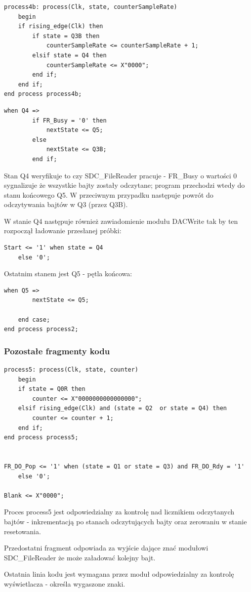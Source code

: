 \documentclass{article}
\begin{document}
\begin{lstlisting}[basicstyle=\small]
 process4b: process(Clk, state, counterSampleRate)
	begin 
	if rising_edge(Clk) then
		if state = Q3B then
			counterSampleRate <= counterSampleRate + 1;
		elsif state = Q4 then
			counterSampleRate <= X"0000";
		end if;
	end if;
end process process4b;
\end{lstlisting}
\newpage
\begin{lstlisting}[basicstyle=\small]
	when Q4 =>
		if FR_Busy = '0' then
			nextState <= Q5;
		else
			nextState <= Q3B;
		end if;
\end{lstlisting}
\par Stan Q4 weryfikuje to czy SDC\_FileReader pracuje - FR\_Busy o wartości 0 sygnalizuje że wszystkie bajty zostały odczytane; program przechodzi wtedy do stanu końcowego Q5. W przeciwnym przypadku następuje powrót do odczytywania bajtów w Q3 (przez Q3B).
\par W stanie Q4 następuje również zawiadomienie modułu DACWrite tak by ten rozpoczął ładowanie przesłanej próbki:
\begin{lstlisting}[basicstyle=\small]
Start <= '1' when state = Q4
	else '0';
\end{lstlisting}
\par Ostatnim stanem jest Q5 - pętla końcowa:
\begin{lstlisting}[basicstyle=\small]
	when Q5 =>
		nextState <= Q5;
	
	end case;
end process process2;
\end{lstlisting}

\subsubsection{Pozostałe fragmenty kodu}

\begin{lstlisting}[basicstyle=\small]
process5: process(Clk, state, counter)
	begin
	if state = Q0R then
		counter <= X"0000000000000000";
	elsif rising_edge(Clk) and (state = Q2  or state = Q4) then
		counter <= counter + 1;
	end if;
end process process5;


FR_DO_Pop <= '1' when (state = Q1 or state = Q3) and FR_DO_Rdy = '1'
	else '0';
	
Blank <= X"0000";
\end{lstlisting}
\par Proces process5 jest odpowiedzialny za kontrolę nad licznikiem odczytanych bajtów - inkrementacją po stanach odczytujących bajty oraz zerowaniu w stanie resetowania.
\par Przedostatni fragment odpowiada za wyjście dające znać modułowi SDC\_FileReader że może załadować kolejny bajt.
\par Ostatnia linia kodu jest wymagana przez moduł odpowiedzialny za kontrolę wyświetlacza - określa wygaszone znaki.
\end{document}
